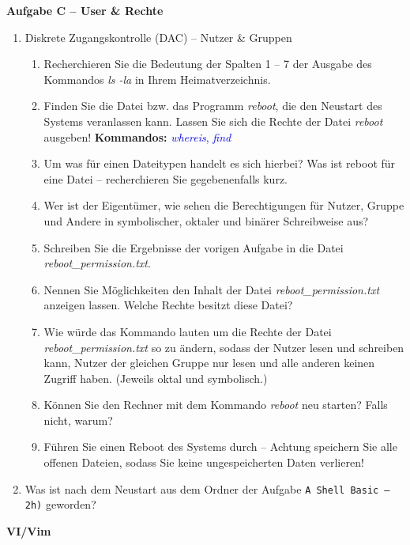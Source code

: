\documentclass[paper=a4,fontsize=11pt]{scrartcl}%
\numberwithin{equation}{section}
\begin{document}
\begin{center}\Large{\textbf{Aufgabe C -- User \& Rechte}}\end{center}\vskip0.25in
\begin{enumerate}
\item Diskrete Zugangskontrolle (DAC) -- Nutzer \& Gruppen
	\begin{enumerate}[label=(\alph*)]
        \item Recherchieren Sie die Bedeutung der Spalten 1 -- 7 der Ausgabe des Kommandos \emph{ls -la} in Ihrem Heimatverzeichnis.
        \item Finden Sie die Datei bzw. das Programm \textit{reboot}, die den Neustart des Systems veranlassen kann. Lassen Sie sich die Rechte der Datei \textit{reboot} ausgeben!
        \textbf{Kommandos:} \textcolor{blue}{\emph{whereis}, \emph{find}}
        \item Um was für einen Dateitypen handelt es sich hierbei? Was ist reboot für eine Datei -- recherchieren Sie gegebenenfalls kurz.
        \item Wer ist der Eigentümer, wie sehen die Berechtigungen für Nutzer, Gruppe und Andere in symbolischer, oktaler und binärer Schreibweise aus?
        \item Schreiben Sie die Ergebnisse der vorigen Aufgabe in die Datei \textit{reboot\-\_permission.txt}.
        \item Nennen Sie Möglichkeiten den Inhalt der Datei \textit{reboot\-\_permission.txt} anzeigen lassen. Welche Rechte besitzt diese Datei?
        \item Wie würde das Kommando lauten um die Rechte der Datei \textit{reboot\-\_permission.txt} so zu ändern, sodass der Nutzer lesen und schreiben kann, Nutzer der gleichen Gruppe nur lesen und alle anderen keinen Zugriff haben. (Jeweils oktal und symbolisch.) 
        \item Können Sie den Rechner mit dem Kommando \textit{reboot} neu starten? Falls nicht, warum? 
        \item Führen Sie einen Reboot des Systems durch -- Achtung speichern Sie alle offenen Dateien, sodass Sie keine ungespeicherten Daten verlieren!
  \end{enumerate}
  \item Was ist nach dem Neustart aus dem Ordner der Aufgabe \texttt{A Shell Basic -- 2h)} geworden?
\end{enumerate}
\begin{center}\Large{\textbf{VI/Vim}}\end{center}\vskip0.25in
\end{document}
